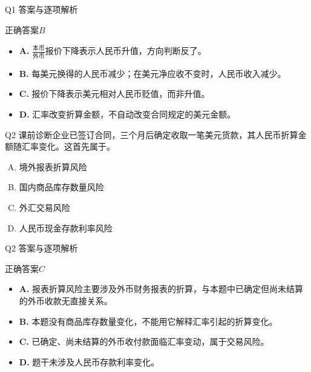 \documentclass[aspectratio=169,compress,11pt]{beamer}
\newcommand{\currentweeklabel}{导入}
\begin{document}
\renewcommand{\currentweeklabel}{导入}\begin{frame}[t]{Q1 答案与逐项解析}\relax\hypertarget{slide4}{}\fontsize{10.5}{12.8}\selectfont\setlength{\abovedisplayskip}{.25em}\setlength{\belowdisplayskip}{.25em}\begin{exampleblock}{正确答案}\(B\)\end{exampleblock}\begin{itemize}\setlength{\itemsep}{.4em}\item \textbf{A. }\(\frac{\text{本币}}{\text{外币}}\)报价下降表示人民币升值，方向判断反了。\item \textbf{B. }每美元换得的人民币减少；在美元净应收不变时，人民币收入减少。\item \textbf{C. }报价下降表示美元相对人民币贬值，而非升值。\item \textbf{D. }汇率改变折算金额，不自动改变合同规定的美元金额。\end{itemize}\end{frame}
\renewcommand{\currentweeklabel}{识险}\begin{frame}[t]{Q2 课前诊断}\relax\hypertarget{slide5}{}\fontsize{10.5}{12.8}\selectfont\setlength{\abovedisplayskip}{.25em}\setlength{\belowdisplayskip}{.25em}企业已签订合同，三个月后确定收取一笔美元货款，其人民币折算金额随汇率变化。这首先属于。\par\vspace{.7em}\begin{enumerate}[A.]\setlength{\itemsep}{.7em}\item 境外报表折算风险\item 国内商品库存数量风险\item 外汇交易风险\item 人民币现金存款利率风险\end{enumerate}\end{frame}
\renewcommand{\currentweeklabel}{识险}\begin{frame}[t]{Q2 答案与逐项解析}\relax\hypertarget{slide6}{}\fontsize{10.5}{12.8}\selectfont\setlength{\abovedisplayskip}{.25em}\setlength{\belowdisplayskip}{.25em}\begin{exampleblock}{正确答案}\(C\)\end{exampleblock}\begin{itemize}\setlength{\itemsep}{.4em}\item \textbf{A. }报表折算风险主要涉及外币财务报表的折算，与本题中已确定但尚未结算的外币收款无直接关系。\item \textbf{B. }本题没有商品库存数量变化，不能用它解释汇率引起的折算变化。\item \textbf{C. }已确定、尚未结算的外币收付款面临汇率变动，属于交易风险。\item \textbf{D. }题干未涉及人民币存款利率变化。\end{itemize}\end{frame}
\end{document}
